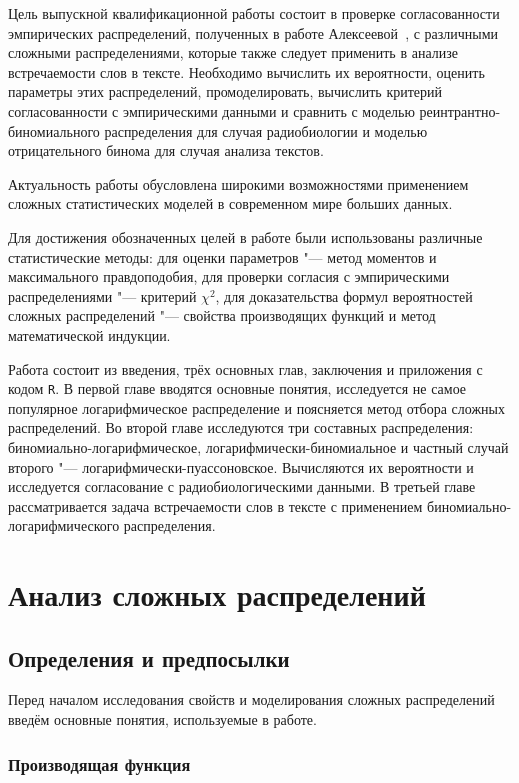 \documentclass[12pt, specialist, subf, substylefile = spbu.rtx]{disser}
\begin{document}
	Цель выпускной квалификационной работы состоит в проверке согласованности эмпирических распределений, полученных в работе Алексеевой~\cite{bib:alexeeva2008}, с различными сложными распределениями, которые также следует применить в анализе встречаемости слов в тексте. Необходимо вычислить их вероятности, оценить параметры этих распределений, промоделировать, вычислить критерий согласованности с эмпирическими данными и сравнить с моделью реинтрантно-биномиального распределения для случая радиобиологии и моделью отрицательного бинома для случая анализа текстов.
	
	Актуальность работы обусловлена широкими возможностями применением сложных статистических моделей в современном мире больших данных.

	Для достижения обозначенных целей в работе были использованы различные статистические методы: для оценки параметров "--- метод моментов и максимального правдоподобия, для проверки согласия с эмпирическими распределениями "--- критерий $\chi ^2$, для доказательства формул вероятностей сложных распределений "--- свойства производящих функций и метод математической индукции.
	
	Работа состоит из введения, трёх основных глав, заключения и приложения с кодом \verb*|R|. В первой главе вводятся основные понятия, исследуется не самое популярное логарифмическое распределение и поясняется метод отбора сложных распределений. Во второй главе исследуются три составных распределения: биномиально-логарифмическое, логарифмически-биномиальное и частный случай второго "--- логарифмически-пуассоновское. Вычисляются их вероятности и исследуется согласование с радиобиологическими данными. В третьей главе рассматривается задача встречаемости слов в тексте с применением биномиально-логарифмического распределения.
	
	\chapter{Анализ сложных распределений}
	
	\section{Определения и предпосылки}
	
	Перед началом исследования свойств и моделирования сложных распределений введём основные понятия, используемые в работе.
	
	\subsection{Производящая функция}
	
\end{document}
